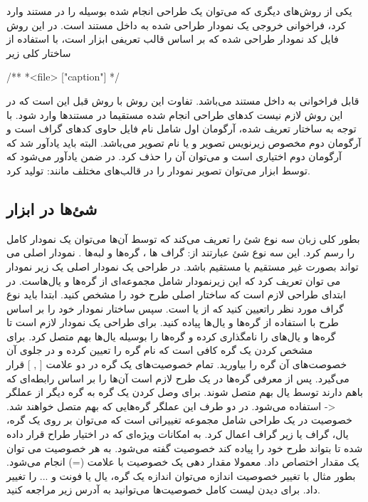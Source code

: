 یکی از روش‌های دیگری که می‌توان یک طراحی انجام شده بوسیله  را در مستند وارد کرد، فراخوانی خروجی یک نمودار طراحی شده به داخل مستند است. در این روش فایل کد نمودار طراحی شده که بر اساس قالب تعریفی ابزار  است، با استفاده از ساختار کلی زیر
\begin{C++}
/**
 *\dotfile <file> ["caption"]
 */
\end{C++}

قابل فراخوانی به داخل مستند می‌باشد. تفاوت این روش با روش قبل این است که در این روش لازم نیست کدهای طراحی انجام شده مستقیما در مستندها وارد شود. با توجه به ساختار تعریف شده، آرگومان اول شامل نام فایل حاوی کدهای گراف است و آرگومان دوم مخصوص زیرنویس تصویر و یا نام تصویر می‌باشد. البته باید یادآور شد که آرگومان دوم اختیاری است و می‌توان آن را حذف کرد.
در ضمن یادآور می‌شود که توسط ابزار  می‌توان تصویر نمودار را در قالب‌های مختلف مانند:
تولید کرد.
\subsection{شئ‌ها در ابزار }
بطور کلی زبان  سه نوع شئ را تعریف می‌کند که توسط آن‌ها می‌توان یک نمودار کامل را رسم کرد. این سه نوع شئ عبارتند از: گراف ها  ، گره‌ها  و لبه‌ها  . نمودار اصلی می تواند بصورت  غیر مستقیم یا  مستقیم باشد. در طراحی یک نمودار اصلی یک زیر نمودار  می توان تعریف کرد که این زیرنمودار شامل مجموعه‌ای از گره‌ها و یال‌هاست.
در ابتدای طراحی لازم است که ساختار اصلی طرح خود را مشخص کنید. ابتدا باید نوع گراف مورد نظر راتعیین کنید که از  یا  است. سپس ساختار نمودار خود را بر اساس طرح با استفاده از گره‌ها و یال‌ها پیاده کنید.
برای طراحی یک نمودار لازم است تا گره‌ها و یال‌های را نامگذاری کرده و گره‌ها را بوسیله یال‌ها بهم متصل کرد. برای مشخص کردن یک گره کافی است که نام گره را تعیین کرده و در جلوی آن خصوصت‌های آن گره را بیاورید. تمام خصوصیت‌های یک گره در دو علامت [ , ] قرار می‌گیرد. پس از معرفی گره‌ها در یک طرح لازم است آن‌ها را بر اساس رابطه‌ای که باهم دارند توسط یال بهم متصل شوند. برای وصل کردن یک گره به گره دیگر از عملگر {<-} استفاده می‌شود. در دو طرف این عملگر گره‌هایی که بهم متصل خواهند شد.
خصوصیت در یک طراحی شامل مجموعه تغییراتی است که می‌توان بر روی یک گره، یال،‌ گراف یا زیر گراف اعمال کرد. به امکانات ویژه‌ای که در اختیار طراح قرار داده شده تا بتواند طرح خود را پیاده کند خصوصیت گفته می‌شود. به هر خصوصیت می توان یک مقدار اختصاص داد. معمولا مقدار دهی یک خصوصیت با علامت (=) انجام می‌شود. بطور مثال با تغییر خصوصیت اندازه می‌‌توان اندازه یک گره، یال یا فونت و ... را تغییر داد. 
برای دیدن لیست کامل خصوصیت‌ها می‌توانید به آدرس زیر مراجعه کنید.%
